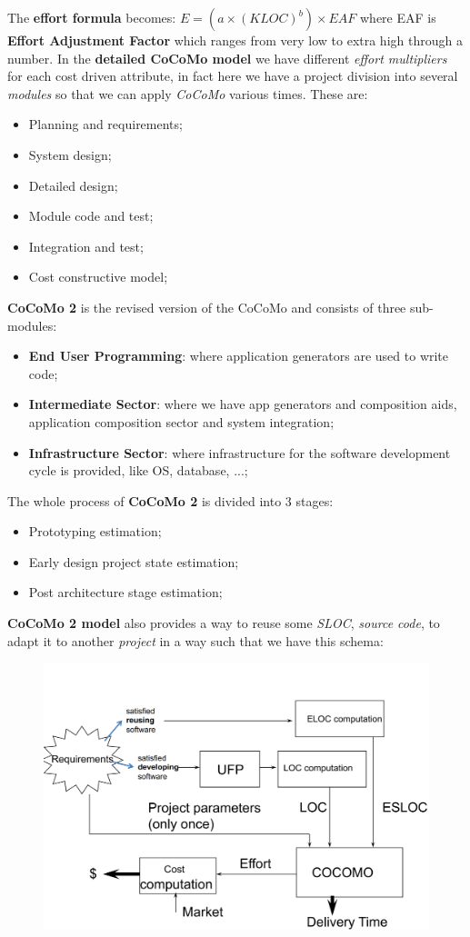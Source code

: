 \documentclass{article}
\begin{document}
The \textbf{effort formula} becomes: $E = (a \times (KLOC)^b) \times EAF$ where EAF is \textbf{Effort Adjustment Factor} which ranges from very low to extra high through a number. In the \textbf{detailed CoCoMo model} we have different \emph{effort multipliers} for each cost driven attribute, in fact here we have a project division into several \emph{modules} so that we can apply \emph{CoCoMo} various times. These are:
\begin{itemize}
\item Planning and requirements;
\item System design;
\item Detailed design;
\item Module code and test;
\item Integration and test;
\item Cost constructive model;
\end{itemize}
\textbf{CoCoMo 2} is the revised version of the CoCoMo and consists of three sub-modules:
\begin{itemize}
\item \textbf{End User Programming}: where application generators are used to write code;
\item \textbf{Intermediate Sector}: where we have app generators and composition aids, application composition sector and system integration;
\item \textbf{Infrastructure Sector}: where infrastructure for the software development cycle is provided, like OS, database, ...;
\end{itemize}
The whole process of \textbf{CoCoMo 2} is divided into 3 stages:
\begin{itemize}
\item Prototyping estimation; 
\item Early design project state estimation;
\item Post architecture stage estimation; 
\end{itemize}
\textbf{CoCoMo 2 model} also provides a way to reuse some \emph{SLOC}, \emph{source code}, to adapt it to another \emph{project} in a way such that we have this schema:
\begin{figure}[H]
  \centering
  \includegraphics[scale=0.4]{cattura8.png}
\end{figure}
\clearpage
\end{document}
